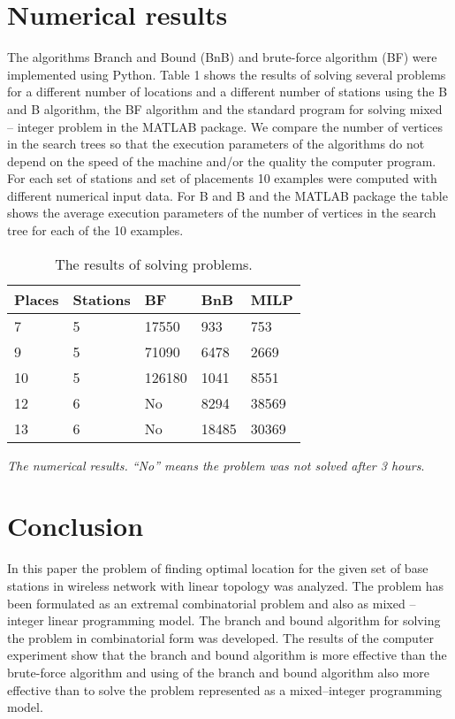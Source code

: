 \section{Numerical results}
The algorithms Branch and Bound (BnB) and brute-force algorithm (BF) were implemented using Python.
Table 1 shows the results of solving several problems for a different number of locations and a different number of stations using the B and B algorithm, the BF algorithm and the standard program for solving mixed – integer problem in the MATLAB package. We compare the number of vertices in the search trees so that the execution parameters of the algorithms do not depend on the speed of the machine and/or the quality the computer program. For each set of stations and set of placements   10 examples were computed with different numerical input data. For B and B and the MATLAB package the table shows the average execution parameters of the number of vertices in the search tree for each of the 10 examples.

\begin{table}
\caption{The results of solving problems.}\label{tab1}
\begin{tabular}{|l|l|l|l|l|}
\hline
{\bfseries Places} & {\bfseries Stations} &	{\bfseries BF}& {\bfseries BnB} & {\bfseries MILP} \\ 
\hline
7 &		5 &	17550  &	933 &		753\\
9 &		5 &	71090  &	6478 &		2669\\
10 &	5 &	126180 &	1041 &		8551\\
12 &	6 &	No &		8294 &		38569\\
13 & 	6 &	No &		18485 &		30369\\
\hline
\end{tabular}
\end{table}

\textit {The numerical results. “No” means the problem was not solved after 3 hours}. 

\section{Conclusion}

In this  paper the problem of finding optimal location for the  given set of base stations in wireless network with linear topology was analyzed. The problem has been formulated as an  extremal combinatorial problem and also as mixed – integer linear programming model.  The branch and bound algorithm for solving the problem in combinatorial form was developed. The results of the computer experiment show that the branch and bound algorithm is more effective than the brute-force algorithm and using of the branch and bound algorithm also more effective than to solve the problem represented as a mixed–integer programming model.
